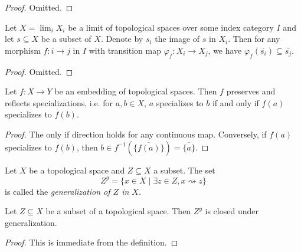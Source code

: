 \begin{proof}
  \leanok
  Omitted.
\end{proof}

\begin{lemma}
  \label{thm:closure-limit-compatible}
  Let $X = \lim_i X_i$ be a limit of topological spaces over some index category \(I\) and let
  $s \subseteq X$ be a subset of \(X\). Denote by $s_i$ the image of $s$ in $X_i$. Then for any morphism \(f : i \to j\) in \(I\) with transition map \(\varphi_{f} : X_i \to X_j\), we have \(\varphi_{f}(\overline{s_i}) \subseteq \overline{s_j}\).
  \leanok
\end{lemma}

\begin{proof}
  \leanok
  Omitted.
\end{proof}


\begin{lemma}
    Let $f\colon X \to Y$ be an embedding of topological spaces. Then $f$ preserves and reflects
    specializations, i.e. for $a, b \in X$, $a$ specializes to $b$ if and only if $f(a)$ specializes to $f(b)$.
    \label{lemma:embedding-specializations}
    \leanok
\end{lemma}

\begin{proof}
    \leanok
    The only if direction holds for any continuous map. Conversely, if $f(a)$ specializes to $f(b)$, then
    $b \in f^{-1}(\overline{\{f(a)\}}) = \overline{\{a\} }$.
\end{proof}

\begin{definition}
    Let $X$ be a topological space and $Z \subseteq X$ a subset. The set
    \[
    Z^g = \{ x \in X \mid \exists z \in Z, x \rightsquigarrow z \}
    \] is called the \emph{generalization of $Z$ in $X$}.
    \label{def:generalization}
    \leanok
\end{definition}

\begin{lemma}
    Let $Z \subseteq X$ be a subset of a topological space. Then $Z^g$ is closed under generalization.
    \label{lemma:generalization-stable-generalization}
    \leanok
\end{lemma}

\begin{proof}
    \leanok
    This is immediate from the definition.
\end{proof}

